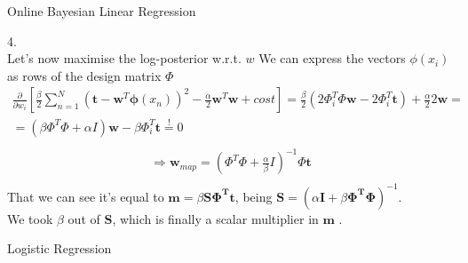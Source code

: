 \documentclass[english]{exercisesheet}
\begin{document}
\begin{nexercise}{Online Bayesian Linear Regression}
\begin{solution}
      \end{solution}
      \par
      \begin{solution} 4.\\
      Let's now maximise the log-posterior w.r.t. $w$
      We can express the vectors $\phi(x_{i})$ as rows of the design matrix $\Phi$
      \begin{align*}
          \frac{\partial}{\partial w_{i}}\left[\frac{\beta}{2}\sum_{n=1}^{N}(\bm{t}-\bm{w}^{T}\bm{\phi}(x_{n}))^{2}-\frac{\alpha}{2}\bm{w}^{T}\bm{w}+cost \right] = \frac{\beta}{2}(2\Phi_{i}^{T}\Phi \bm{w} - 2\Phi_{i}^{T}\bm{t}) + \frac{\alpha}{2}2\bm{w} = \\ = \left(\beta\Phi^{T}\Phi+\alpha I\right)\bm{w}-\beta\Phi_{i}^{T}\bm{t} \stackrel{!}{=} 0 \\
      \end{align*}
      \begin{align*}
          \Rightarrow \bm{w}_{map} = (\Phi^{T}\Phi + \frac{\alpha}{\beta}I)^{-1}\Phi \bm{t} \\
      \end{align*}
      That we can see it's equal to $\bm{m} = \beta\bm{S\Phi^{T}t}$, being $\bm{S}=\left(\alpha \bm{I} +\beta \bm{\Phi^{T}\Phi}\right)^{-1}$.\\ We took $\beta$ out of $\bm{S}$, which is finally a scalar multiplier in $\bm{m}$ .\\
      \end{solution}
 \end{nexercise}
 
 \begin{nexercise}{Logistic Regression}
\end{nexercise}
\end{document}
